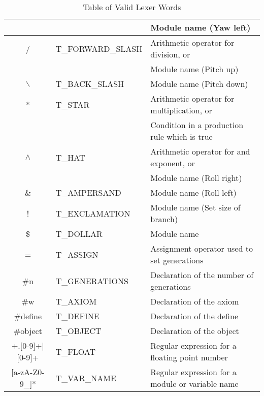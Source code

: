 \begin{table}[h!]
\begin{tabular}{ | c | l | l |}
					&						& Module name (Yaw left)\\
\hline
	/ 				& T\_FORWARD\_SLASH 	& Arithmetic operator for division, or\\
					&						& Module name (Pitch up)\\
\hline
	$\backslash$ 		& T\_BACK\_SLASH 		& Module name (Pitch down)\\
\hline
	* 				& T\_STAR 				& Arithmetic operator for multiplication, or\\
					&						& Condition in a production rule which is true\\
\hline
	$\land$		& T\_HAT 				& Arithmetic operator for and exponent, or\\
					&						& Module name (Roll right)\\
\hline
	$\&$ 			& T\_AMPERSAND 			& Module name (Roll left)\\
\hline
	! 				& T\_EXCLAMATION 		& Module name (Set size of branch)\\
\hline
	\$ 				& T\_DOLLAR 			& Module name \\
\hline
	= 				& T\_ASSIGN 			& Assignment operator used to set generations\\
\hline
	\#n 			& T\_GENERATIONS 		& Declaration of the number of generations\\
\hline
	\#w 			& T\_AXIOM 				& Declaration of the axiom\\
\hline
	\#define 			& T\_DEFINE 		& Declaration of the define\\
\hline
	\#object 			& T\_OBJECT			& Declaration of the object\\
\hline
	[0-9]+.[0-9]+$|$[0-9]+ 					& T\_FLOAT 				& Regular expression for a floating point number\\
\hline
	[a-zA-Z\_][a-zA-Z0-9\_]*  				& T\_VAR\_NAME 			& Regular expression for a module or variable name\\
\hline
\end{tabular}
\caption{Table of Valid Lexer Words}
\label{lexer words}
\end{table}
\FloatBarrier


